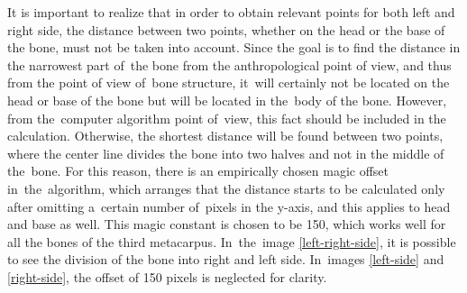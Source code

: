 It is important to realize that in order to obtain relevant points for both left and right side, the distance between two points, whether on the head or the base of the bone, must not be taken into account. Since the goal is to find the distance in the narrowest part of~the bone from the anthropological point of view, and thus from the point of view of~bone structure, it~will certainly not be located on the head or base of the bone but will be located in the~body of the bone. However, from the~computer algorithm point of~view, this fact should be included in the calculation. Otherwise, the shortest distance will be found between two points, where the center line divides the bone into two halves and not in the middle of the~bone. For this reason, there is an empirically chosen magic offset in~the~algorithm, which arranges that the distance starts to be calculated only after omitting a~certain number of~pixels in the y-axis, and this applies to head and base as well. This magic constant is chosen to be 150, which works well for all the bones of the third metacarpus. In~the~image \ref{left-right-side}, it is possible to see the division of the bone into right and left side. In~images \ref{left-side} and \ref{right-side}, the offset of 150 pixels is neglected for clarity.

